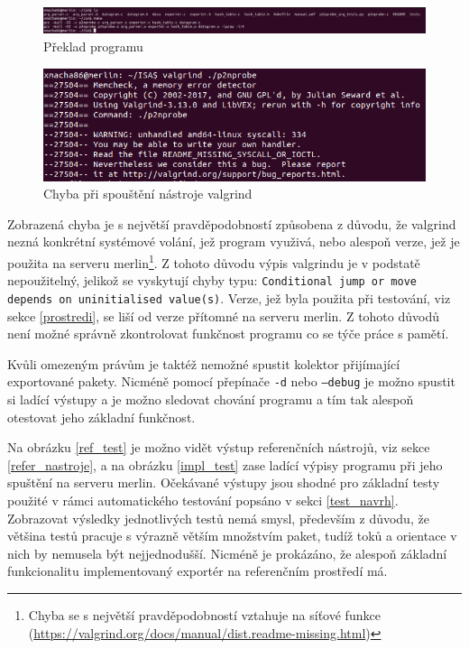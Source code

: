\documentclass[11pt, a4paper, hidelinks]{article}[08.10.2023]
\begin{document}
    \begin{figure}[H]
        \centering
        \includegraphics[width=0.9\linewidth]{pictures/preklad.png}
        \caption{Překlad programu}
        \label{preklad}
    \end{figure}

    \begin{figure}[H]
        \centering
        \includegraphics[width=0.8\linewidth]{pictures/merlin_error.png}
        \caption{Chyba při spouštění nástroje valgrind}
        \label{merlin_error}
    \end{figure}

    Zobrazená chyba je s největší pravděpodobností způsobena z důvodu, že valgrind nezná konkrétní systémové volání, jež program využivá, nebo alespoň verze, jež je použita na serveru merlin\footnote{Chyba se s největší pravděpodobností vztahuje na síťové funkce \\(\url{https://valgrind.org/docs/manual/dist.readme-missing.html})}. Z tohoto důvodu výpis valgrindu je v podstatě nepoužitelný, jelikož se vyskytují chyby typu: \texttt{Conditional jump or move depends on uninitialised value(s)}. Verze, jež byla použita při testování, viz sekce \ref{prostredi}, se liší od verze přítomné na serveru merlin. Z tohoto důvodů není možné správně zkontrolovat funkčnost programu co se týče práce s pamětí. 

    Kvůli omezeným právům je taktéž nemožné spustit kolektor přijímající exportované pakety. Nicméně pomocí přepínače \texttt{-d} nebo \texttt{--debug} je možno spustit si ladící výstupy a je možno sledovat chování programu a tím tak alespoň otestovat jeho základní funkčnost.

    Na obrázku \ref{ref_test} je možno vidět výstup referenčních nástrojů, viz sekce \ref{refer_nastroje}, a na obrázku \ref{impl_test} zase ladící výpisy programu při jeho spuštění na serveru merlin. Očekávané výstupy jsou shodné pro základní testy použité v rámci automatického testování popsáno v sekci \ref{test_navrh}. Zobrazovat výsledky jednotlivých testů nemá smysl, především z důvodu, že většina testů pracuje s výrazně větším množstvím paket, tudíž toků a orientace v nich by nemusela být nejjednodušší. Nicméně je prokázáno, že alespoň základní funkcionalitu implementovaný exportér na referenčním prostředí má. 
\end{document}
